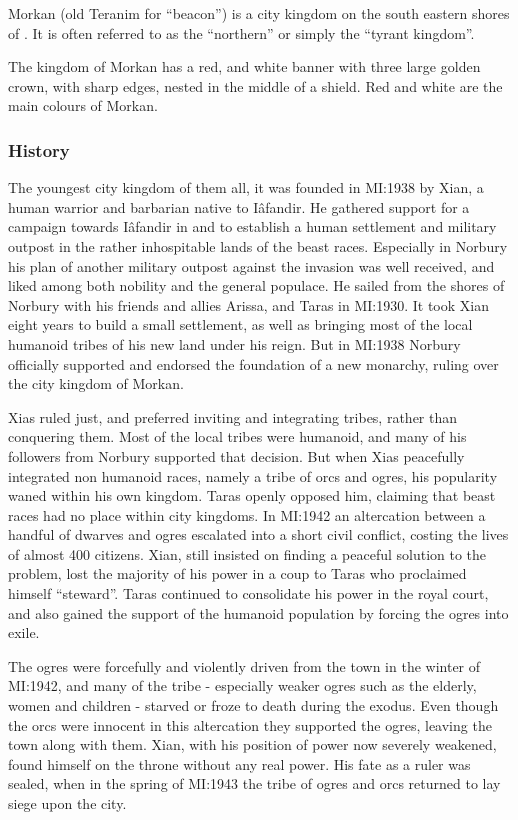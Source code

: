 
Morkan (old Teranim for ``beacon'') is a city kingdom on the south eastern
shores of . It is often referred to as the ``northern''
or simply the ``tyrant kingdom''.

The kingdom of Morkan has a red, and white banner with three large golden
crown, with sharp edges, nested in the middle of a shield. Red and white are
the main colours of Morkan.

\subsubsection{History}

The youngest city kingdom of them all, it was founded in MI:1938 by Xian, a
human warrior and barbarian native to Iâfandir. He gathered support for a
campaign towards Iâfandir in  and 
to establish a human settlement and military outpost in the rather
inhospitable lands of the beast races. Especially in Norbury his plan of
another military outpost against the invasion was well received, and liked
among both nobility and the general populace. He sailed from the shores of
Norbury with his friends and allies Arissa, and Taras in MI:1930. It took Xian
eight years to build a small settlement, as well as bringing most of the local
humanoid tribes of his new land under his reign. But in MI:1938 Norbury
officially supported and endorsed the foundation of a new monarchy, ruling
over the city kingdom of Morkan.

Xias ruled just, and preferred inviting and integrating tribes, rather than
conquering them. Most of the local tribes were humanoid, and many of his
followers from Norbury supported that decision. But when Xias peacefully
integrated non humanoid races, namely a tribe of orcs and ogres, his
popularity waned within his own kingdom. Taras openly opposed him, claiming
that beast races had no place within city kingdoms. In MI:1942 an
altercation between a handful of dwarves and ogres escalated into a short
civil conflict, costing the lives of almost 400 citizens. Xian, still insisted
on finding a peaceful solution to the problem, lost the majority of his power
in a coup to Taras who proclaimed himself ``steward''. Taras continued to
consolidate his power in the royal court, and also gained the support of the
humanoid population by forcing the ogres into exile.

The ogres were forcefully and violently driven from the town in the winter of
MI:1942, and many of the tribe - especially weaker ogres such as the
elderly, women and children - starved or froze to death during the exodus. Even
though the orcs were innocent in this altercation they supported the ogres,
leaving the town along with them. Xian, with his position of power now
severely weakened, found himself on the throne without any real power. His
fate as a ruler was sealed, when in the spring of MI:1943 the tribe of
ogres and orcs returned to lay siege upon the city.

